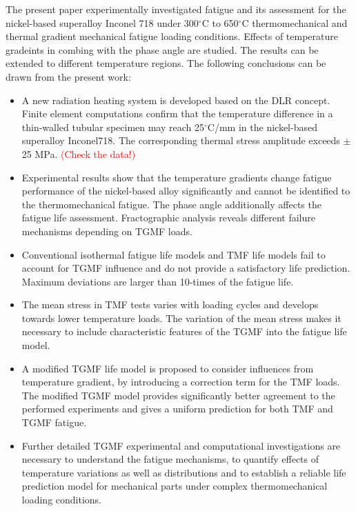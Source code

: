 \documentclass[preprint,5p,twocolumn,10pt,sort&compress]{elsarticle}
\newcommand{\degreeC}{{$^\circ$C}}
\newcommand{\marked}[1]{\textcolor{red}{#1}}
\begin{document}
The present paper experimentally investigated fatigue and its assessment for the nickel-based superalloy Inconel 718  under 300$^\circ$C to 650$^\circ$C thermomechanical and thermal gradient mechanical fatigue loading conditions. Effects of temperature gradeints in combing with the phase angle are studied. The results can be extended to different temperature regions. The following conclusions can be drawn from the present work:
\begin{itemize}
\item A new radiation heating system is developed based on the DLR concept. Finite element computations confirm that the temperature difference in a thin-walled tubular specimen may reach 25\degreeC/mm in the nickel-based superalloy Inconel718. The corresponding thermal stress amplitude exceeds $\pm$25 MPa. \marked{(Check the data!)}

\item Experimental results show that the  temperature gradients change {fatigue performance} of the nickel-based alloy significantly and cannot be identified to the thermomechanical fatigue. The phase angle additionally affects the fatigue life assessment.  Fractographic analysis reveals different failure mechanisms depending on TGMF loads.

\item Conventional isothermal fatigue life models and TMF life models fail to account for TGMF influence and do not provide a satisfactory life prediction. Maximum deviations are larger than 10-times of the fatigue life.

\item The mean stress in TMF tests varies with loading cycles and develops towards lower temperature loads. The variation of the mean stress makes it necessary to include characteristic features of the TGMF into the fatigue life model.

\item A modified TGMF life model is proposed to consider influences from  temperature gradient, by introducing a correction term for the TMF loads. The modified TGMF model provides significantly better agreement to the performed experiments and gives a uniform prediction for both TMF and TGMF fatigue.

\item Further detailed TGMF experimental and computational investigations are necessary to understand the fatigue mechanisms, to quantify effects of temperature variations as well as distributions and to establish a reliable life prediction model for mechanical parts under complex thermomechanical loading conditions.

\end{itemize}
\end{document}
